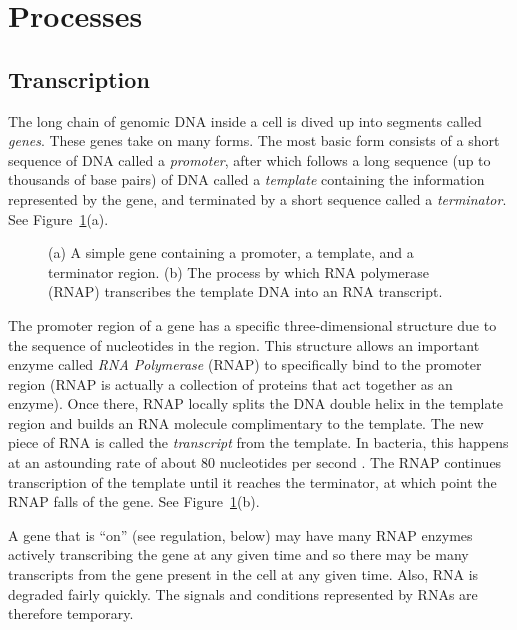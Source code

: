 \section{Processes}

\subsection{Transcription}


The long chain of genomic DNA inside a cell is dived up into segments
called {\em genes}. These genes take on many forms. The most basic
form consists of a short sequence of DNA called a {\em promoter},
after which follows a long sequence (up to thousands of base pairs) of
DNA called a {\em template} containing the information represented by
the gene, and terminated by a short sequence called a {\em
  terminator}. See Figure~\ref{fig:transcription}(a).

\begin{figure}
  \caption{\label{fig:transcription} (a) A simple gene containing a
    promoter, a template, and a terminator region. (b) The process by
    which RNA polymerase (RNAP) transcribes the template DNA into an
    RNA transcript. }
\end{figure}

The promoter region of a gene has a specific three-dimensional
structure due to the sequence of nucleotides in the region. This
structure allows an important enzyme called {\em RNA Polymerase}
(RNAP) to specifically bind to the promoter region (RNAP is actually a
collection of proteins that act together as an enzyme). Once there,
RNAP locally splits the DNA double helix in the template region and
builds an RNA molecule complimentary to the template. The new piece of
RNA is called the {\em transcript} from the template. In bacteria,
this happens at an astounding rate of about 80 nucleotides per second
\cite{alon-book}. The RNAP continues transcription of the template
until it reaches the terminator, at which point the RNAP falls of the
gene. See Figure~\ref{fig:transcription}(b).

A gene that is ``on'' (see regulation, below) may have many RNAP
enzymes actively transcribing the gene at any given time and so there
may be many transcripts from the gene present in the cell at any given
time. Also, RNA is degraded fairly quickly. The signals and conditions
represented by RNAs are therefore temporary.

